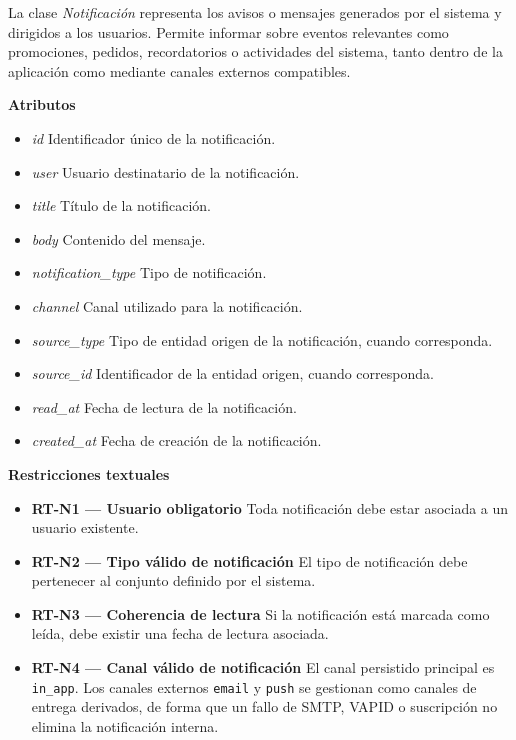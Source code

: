 La clase \textit{Notificación} representa los avisos o mensajes generados por el sistema y dirigidos a los usuarios. Permite informar sobre eventos relevantes como promociones, pedidos, recordatorios o actividades del sistema, tanto dentro de la aplicación como mediante canales externos compatibles.

\textbf{Atributos}

\begin{itemize}

      \item \textit{id}
            Identificador único de la notificación.
      \item \textit{user}
            Usuario destinatario de la notificación.
      \item \textit{title}
            Título de la notificación.
      \item \textit{body}
            Contenido del mensaje.
      \item \textit{notification\_type}
            Tipo de notificación.
      \item \textit{channel}
            Canal utilizado para la notificación.
      \item \textit{source\_type}
            Tipo de entidad origen de la notificación, cuando corresponda.
      \item \textit{source\_id}
            Identificador de la entidad origen, cuando corresponda.
      \item \textit{read\_at}
            Fecha de lectura de la notificación.
      \item \textit{created\_at}
            Fecha de creación de la notificación.

\end{itemize}

\textbf{Restricciones textuales}

\begin{itemize}

      \item \textbf{RT-N1 — Usuario obligatorio}
            Toda notificación debe estar asociada a un usuario existente.
      \item \textbf{RT-N2 — Tipo válido de notificación}
            El tipo de notificación debe pertenecer al conjunto definido por el sistema.
      \item \textbf{RT-N3 — Coherencia de lectura}
            Si la notificación está marcada como leída, debe existir una fecha de lectura asociada.
      \item \textbf{RT-N4 — Canal válido de notificación}
            El canal persistido principal es \texttt{in\_app}. Los canales externos \texttt{email} y \texttt{push} se gestionan como canales de entrega derivados, de forma que un fallo de SMTP, VAPID o suscripción no elimina la notificación interna.

\end{itemize}

